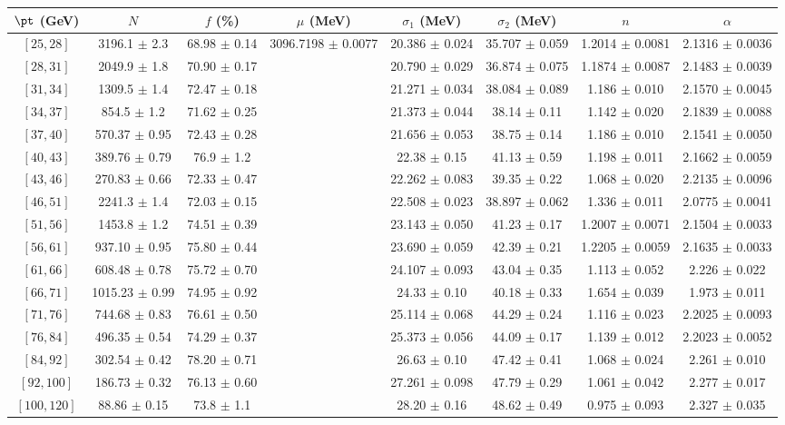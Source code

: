 \begin{tabular}{c||c|c|c|c|c|c|c}
$\pt$ (GeV) & $N$ & $f$ (\%) & $\mu$ (MeV) & $\sigma_1$ (MeV) & $\sigma_2$ (MeV) & $n$ & $\alpha$ \\
\hline
$[25, 28]$ & 3196.1 $\pm$ 2.3 & 68.98 $\pm$ 0.14 & \multirow{17}{*}{3096.7198 $\pm$ 0.0077} & 20.386 $\pm$ 0.024 & 35.707 $\pm$ 0.059 & 1.2014 $\pm$ 0.0081 & 2.1316 $\pm$ 0.0036\\
$[28, 31]$ & 2049.9 $\pm$ 1.8 & 70.90 $\pm$ 0.17 &  & 20.790 $\pm$ 0.029 & 36.874 $\pm$ 0.075 & 1.1874 $\pm$ 0.0087 & 2.1483 $\pm$ 0.0039\\
$[31, 34]$ & 1309.5 $\pm$ 1.4 & 72.47 $\pm$ 0.18 &  & 21.271 $\pm$ 0.034 & 38.084 $\pm$ 0.089 & 1.186 $\pm$ 0.010 & 2.1570 $\pm$ 0.0045\\
$[34, 37]$ & 854.5 $\pm$ 1.2 & 71.62 $\pm$ 0.25 &  & 21.373 $\pm$ 0.044 & 38.14 $\pm$ 0.11 & 1.142 $\pm$ 0.020 & 2.1839 $\pm$ 0.0088\\
$[37, 40]$ & 570.37 $\pm$ 0.95 & 72.43 $\pm$ 0.28 &  & 21.656 $\pm$ 0.053 & 38.75 $\pm$ 0.14 & 1.186 $\pm$ 0.010 & 2.1541 $\pm$ 0.0050\\
$[40, 43]$ & 389.76 $\pm$ 0.79 & 76.9 $\pm$ 1.2 &  & 22.38 $\pm$ 0.15 & 41.13 $\pm$ 0.59 & 1.198 $\pm$ 0.011 & 2.1662 $\pm$ 0.0059\\
$[43, 46]$ & 270.83 $\pm$ 0.66 & 72.33 $\pm$ 0.47 &  & 22.262 $\pm$ 0.083 & 39.35 $\pm$ 0.22 & 1.068 $\pm$ 0.020 & 2.2135 $\pm$ 0.0096\\
$[46, 51]$ & 2241.3 $\pm$ 1.4 & 72.03 $\pm$ 0.15 &  & 22.508 $\pm$ 0.023 & 38.897 $\pm$ 0.062 & 1.336 $\pm$ 0.011 & 2.0775 $\pm$ 0.0041\\
$[51, 56]$ & 1453.8 $\pm$ 1.2 & 74.51 $\pm$ 0.39 &  & 23.143 $\pm$ 0.050 & 41.23 $\pm$ 0.17 & 1.2007 $\pm$ 0.0071 & 2.1504 $\pm$ 0.0033\\
$[56, 61]$ & 937.10 $\pm$ 0.95 & 75.80 $\pm$ 0.44 &  & 23.690 $\pm$ 0.059 & 42.39 $\pm$ 0.21 & 1.2205 $\pm$ 0.0059 & 2.1635 $\pm$ 0.0033\\
$[61, 66]$ & 608.48 $\pm$ 0.78 & 75.72 $\pm$ 0.70 &  & 24.107 $\pm$ 0.093 & 43.04 $\pm$ 0.35 & 1.113 $\pm$ 0.052 & 2.226 $\pm$ 0.022\\
$[66, 71]$ & 1015.23 $\pm$ 0.99 & 74.95 $\pm$ 0.92 &  & 24.33 $\pm$ 0.10 & 40.18 $\pm$ 0.33 & 1.654 $\pm$ 0.039 & 1.973 $\pm$ 0.011\\
$[71, 76]$ & 744.68 $\pm$ 0.83 & 76.61 $\pm$ 0.50 &  & 25.114 $\pm$ 0.068 & 44.29 $\pm$ 0.24 & 1.116 $\pm$ 0.023 & 2.2025 $\pm$ 0.0093\\
$[76, 84]$ & 496.35 $\pm$ 0.54 & 74.29 $\pm$ 0.37 &  & 25.373 $\pm$ 0.056 & 44.09 $\pm$ 0.17 & 1.139 $\pm$ 0.012 & 2.2023 $\pm$ 0.0052\\
$[84, 92]$ & 302.54 $\pm$ 0.42 & 78.20 $\pm$ 0.71 &  & 26.63 $\pm$ 0.10 & 47.42 $\pm$ 0.41 & 1.068 $\pm$ 0.024 & 2.261 $\pm$ 0.010\\
$[92, 100]$ & 186.73 $\pm$ 0.32 & 76.13 $\pm$ 0.60 &  & 27.261 $\pm$ 0.098 & 47.79 $\pm$ 0.29 & 1.061 $\pm$ 0.042 & 2.277 $\pm$ 0.017\\
$[100, 120]$ & 88.86 $\pm$ 0.15 & 73.8 $\pm$ 1.1 &  & 28.20 $\pm$ 0.16 & 48.62 $\pm$ 0.49 & 0.975 $\pm$ 0.093 & 2.327 $\pm$ 0.035\\
\end{tabular}
